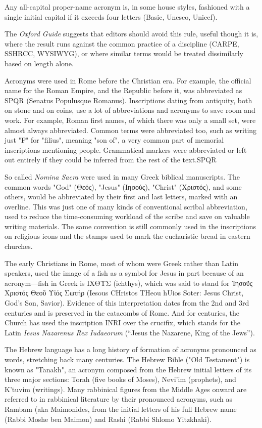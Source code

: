 Any all-capital proper-name acronym is, in some house styles, fashioned
with a single initial capital if it exceeds four letters (Basic, Unesco, Unicef).

The \textit{Oxford Guide} suggests that editors should avoid this rule, useful though it is, where the result runs
against the common practice of a discipline (CARPE, SSHRCC, WYSIWYG), or where similar terms would be treated dissimilarly based on length alone.


Acronyms were used in Rome before the Christian era. For example, the official name for the Roman Empire, and the Republic before it, was abbreviated as SPQR (Senatus Populusque Romanus). Inscriptions dating from antiquity, both on stone and on coins, use a lot of abbreviations and acronyms to save room and work. For example, Roman first names, of which there was only a small set, were almost always abbreviated. Common terms were abbreviated too, such as writing just "F" for "filius", meaning "son of", a very common part of memorial inscriptions mentioning people. Grammatical markers were abbreviated or left out entirely if they could be inferred from the rest of the text.\ac{SPQR}

So called \textit{Nomina Sacra} were used in many Greek biblical manuscripts. The common words "God" (Θεός), "Jesus" (Ιησούς), "Christ" (Χριστός), and some others, would be abbreviated by their first and last letters, marked with an overline. This was just one of many kinds of conventional scribal abbreviation, used to reduce the time-consuming workload of the scribe and save on valuable writing materials. The same convention is still commonly used in the inscriptions on religious icons and the stamps used to mark the eucharistic bread in eastern churches.

The early Christians in Rome, most of whom were Greek rather than Latin speakers, used the image of a fish as a symbol for Jesus in part because of an acronym—fish in Greek is ΙΧΘΥΣ (ichthys), which was said to stand for Ἰησοῦς Χριστός Θεοῦ Υἱός Σωτήρ (Iesous CHristos THeou hUios Soter: Jesus Christ, God's Son, Savior). Evidence of this interpretation dates from the 2nd and 3rd centuries and is preserved in the catacombs of Rome. And for centuries, the Church has used the inscription INRI over the crucifix, which stands for the Latin \textit{Iesus Nazarenus Rex Iudaeorum} (``Jesus the Nazarene, King of the Jews'').

The Hebrew language has a long history of formation of acronyms pronounced as words, stretching back many centuries. The Hebrew Bible ("Old Testament") is known as "Tanakh", an acronym composed from the Hebrew initial letters of its three major sections: Torah (five books of Moses), Nevi'im (prophets), and K'tuvim (writings). Many rabbinical figures from the Middle Ages onward are referred to in rabbinical literature by their pronounced acronyms, such as Rambam (aka Maimonides, from the initial letters of his full Hebrew name (Rabbi Moshe ben Maimon) and Rashi (Rabbi Shlomo Yitzkhaki).

